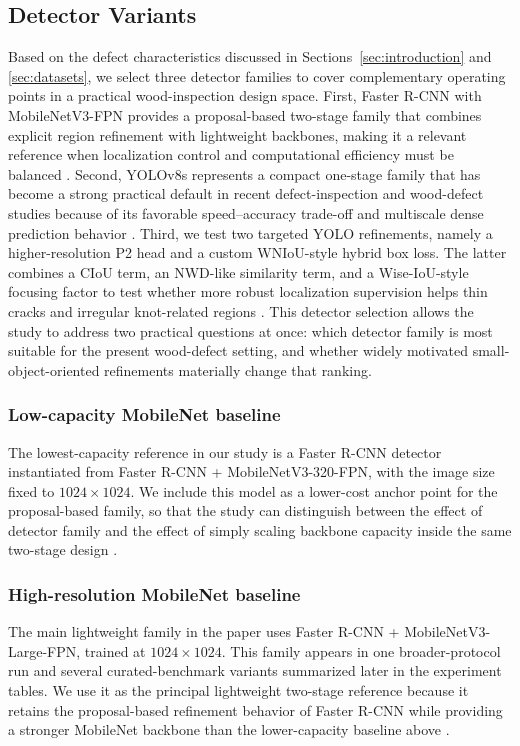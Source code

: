 \documentclass[10pt,a4paper]{article}
\begin{document}
\subsection{Detector Variants}
\label{sec:detectors}

Based on the defect characteristics discussed in Sections~\ref{sec:introduction} and \ref{sec:datasets}, we select three detector families to cover complementary operating points in a practical wood-inspection design space. First, Faster R-CNN with MobileNetV3-FPN provides a proposal-based two-stage family that combines explicit region refinement with lightweight backbones, making it a relevant reference when localization control and computational efficiency must be balanced \citep{faster_rcnn,mobilenetv3,mittal_2024}. Second, YOLOv8s represents a compact one-stage family that has become a strong practical default in recent defect-inspection and wood-defect studies because of its favorable speed--accuracy trade-off and multiscale dense prediction behavior \citep{odca_yolo,bpn_yolo,sim_yolo,fdd_yolo}. Third, we test two targeted YOLO refinements, namely a higher-resolution P2 head and a custom WNIoU-style hybrid box loss. The latter combines a CIoU term, an NWD-like similarity term, and a Wise-IoU-style focusing factor to test whether more robust localization supervision helps thin cracks and irregular knot-related regions \citep{tong_2023_wiseiou,wang_2021_nwd,zheng_2020_diou}. This detector selection allows the study to address two practical questions at once: which detector family is most suitable for the present wood-defect setting, and whether widely motivated small-object-oriented refinements materially change that ranking.


\subsubsection{Low-capacity MobileNet baseline}
The lowest-capacity reference in our study is a Faster R-CNN detector instantiated from Faster R-CNN + MobileNetV3-320-FPN,  with the image size fixed to $1024 \times 1024$. We include this model as a lower-cost anchor point for the proposal-based family, so that the study can distinguish between the effect of detector family and the effect of simply scaling backbone capacity inside the same two-stage design \citep{faster_rcnn,mobilenetv3}.

\subsubsection{High-resolution MobileNet baseline}
The main lightweight family in the paper uses Faster R-CNN + MobileNetV3-Large-FPN, trained at $1024 \times 1024$. This family appears in one broader-protocol run and several curated-benchmark variants summarized later in the experiment tables. We use it as the principal lightweight two-stage reference because it retains the proposal-based refinement behavior of Faster R-CNN while providing a stronger MobileNet backbone than the lower-capacity baseline above \citep{faster_rcnn,mobilenetv3}.
\end{document}
